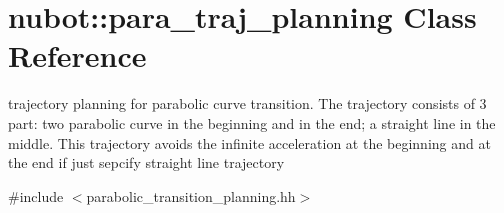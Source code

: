 \hypertarget{classnubot_1_1para__traj__planning}{\section{nubot\-:\-:para\-\_\-traj\-\_\-planning Class Reference}
\label{classnubot_1_1para__traj__planning}
}


trajectory planning for parabolic curve transition. The trajectory consists of 3 part\-: two parabolic curve in the beginning and in the end; a straight line in the middle. This trajectory avoids the infinite acceleration at the beginning and at the end if just sepcify straight line trajectory  




{\ttfamily \#include $<$parabolic\-\_\-transition\-\_\-planning.\-hh$>$}

